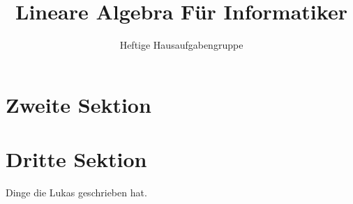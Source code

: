 \documentclass[12pt,a4paper]{article}
\author{Heftige Hausaufgabengruppe}
\title{Lineare Algebra Für Informatiker}
\begin{document}
\maketitle
\makeindex
\section{Zweite Sektion}
\section{Dritte Sektion}
Dinge die Lukas geschrieben hat.
\end{document}

